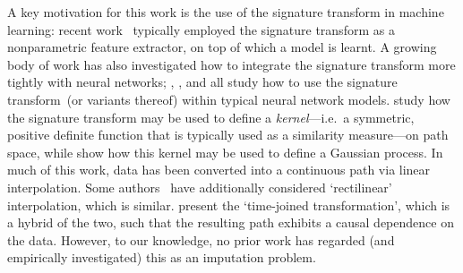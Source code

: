 \documentclass{article}
\begin{document}
A key motivation for this work is the use of the signature transform in
machine learning: recent work~\citep{primer2016,
kormilitzlin2016, yang2016rotation, li2017lpsnet, yang2017leveraging,
PerezArribas2018, morrill2019sepsis} typically employed the signature transform as a nonparametric feature extractor, on top of which
a model is learnt. A growing body of work has also investigated how to
integrate the signature transform more tightly with neural networks; 
\citet{jeremythesis}, \citet{logsigrnn}, and \citet{kidger2019deep} all
study how to use the signature transform~(or variants thereof) within typical neural network models.
\citet{chevyrev2018signature, kiraly2019kernels} study how the signature
transform may be used to define a \emph{kernel}---i.e.\ a symmetric,
positive definite function that is typically used as a similarity
measure---on path space, while \citet{toth2019gp} show how this kernel
may be used to define a Gaussian process.
%
In much of this work, data has been converted into a continuous path via
linear interpolation. Some authors~\citep{primer2016,
fermanian2019embedding} have additionally considered `rectilinear'
interpolation, which is similar. \citet{levin2013} present the
`time-joined transformation', which is a hybrid of the two, such that
the resulting path exhibits a causal dependence on the data.  However,
to our knowledge, no prior work has regarded (and empirically investigated) this as an imputation
problem.
\end{document}
